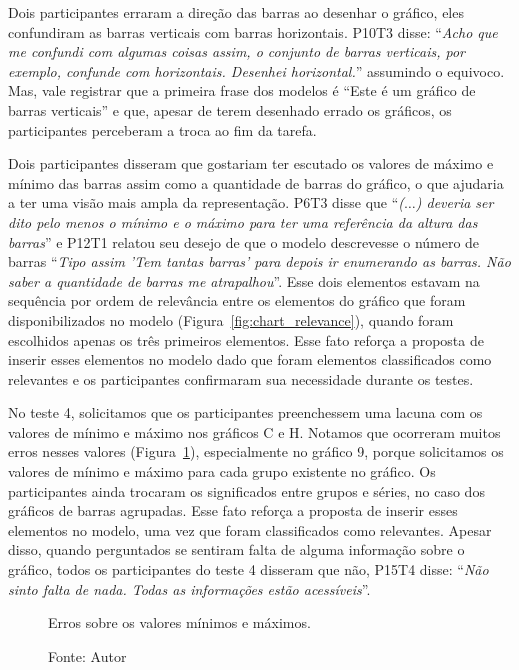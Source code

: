\documentclass[
	12pt,				%
	openright,			%
	oneside,			%
	a4paper,			%
	english,			%
	brazil				%
	]{abntex2}
\begin{document}
Dois participantes erraram a direção das barras ao desenhar o gráfico, eles confundiram as barras verticais com barras horizontais.  P10T3 disse: ``\textit{Acho que me confundi com algumas coisas assim, o conjunto de barras verticais, por exemplo, confunde com horizontais. Desenhei horizontal.}'' assumindo o equivoco. Mas, vale registrar que a primeira frase dos modelos é ``Este é um gráfico de barras verticais'' e que, apesar de terem desenhado errado os gráficos, os participantes  perceberam a troca ao fim da tarefa.

Dois participantes disseram que gostariam ter escutado os valores de máximo e mínimo das barras assim como a quantidade de barras do gráfico, o que ajudaria a ter uma visão mais ampla da representação. P6T3 disse que ``\textit{($\ldots$) deveria ser dito pelo menos o mínimo e o máximo para ter uma referência da altura das barras}'' e P12T1 relatou seu desejo de que o modelo  descrevesse o número de barras ``\textit{Tipo assim 'Tem tantas barras' para depois ir enumerando as barras. Não saber a quantidade de barras me atrapalhou}''. Esse dois elementos estavam na sequência por ordem de relevância entre os elementos do gráfico que foram disponibilizados no modelo (Figura~\ref{fig:chart_relevance}), quando foram escolhidos apenas os três primeiros elementos. Esse fato reforça a proposta de inserir esses elementos no modelo dado que foram elementos classificados como relevantes  e os participantes confirmaram sua necessidade durante os testes.

No teste 4, solicitamos que os participantes preenchessem uma lacuna com os valores de mínimo e máximo nos gráficos C e H. Notamos que ocorreram muitos erros nesses valores (Figura~\ref{fig:minmax}), especialmente no gráfico 9, porque solicitamos os valores de mínimo e máximo para cada grupo existente no gráfico. Os participantes ainda trocaram os significados entre grupos e séries, no caso dos gráficos de barras agrupadas. Esse fato reforça a proposta de inserir esses elementos no modelo, uma vez que foram classificados como relevantes. Apesar disso, quando perguntados se sentiram falta de alguma informação sobre o gráfico, todos os participantes do teste 4 disseram que não, P15T4 disse: ``\textit{Não sinto falta de nada. Todas as informações estão acessíveis}''.

\begin{figure}[!h]
\centering
  \caption{Erros sobre os valores mínimos e máximos.}
  \caption*{Fonte: Autor}
  \label{fig:minmax}
\end{figure}
\end{document}
